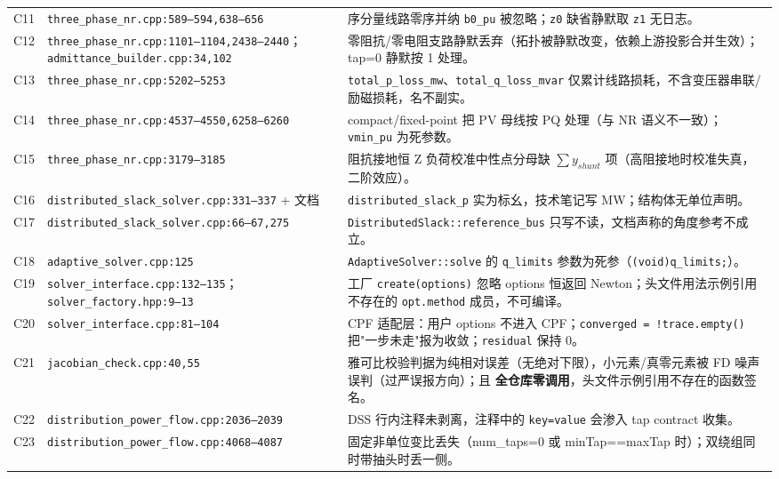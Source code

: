 \documentclass[11pt,a4paper,fontset=fandol]{ctexart}
\newcommand{\file}[1]{\texttt{#1}}
\begin{document}
\begin{footnotesize}
\begin{longtable}{@{}p{0.4cm}p{5.2cm}p{9.6cm}@{}}
C11 & \file{three\_phase\_nr.cpp:589--594,}\newline\file{638--656} & 序分量线路零序并纳 \texttt{b0\_pu} 被忽略；\texttt{z0} 缺省静默取 \texttt{z1} 无日志。\\
C12 & \file{three\_phase\_nr.cpp:1101--1104,}\newline\file{2438--2440}；\file{admittance\_builder.cpp:34,102} & 零阻抗/零电阻支路静默丢弃（拓扑被静默改变，依赖上游投影合并生效）；tap=0 静默按 1 处理。\\
C13 & \file{three\_phase\_nr.cpp:5202--5253} & \texttt{total\_p\_loss\_mw}、\texttt{total\_q\_loss\_mvar} 仅累计线路损耗，不含变压器串联/励磁损耗，名不副实。\\
C14 & \file{three\_phase\_nr.cpp:4537--4550,}\newline\file{6258--6260} & compact/fixed-point 把 PV 母线按 PQ 处理（与 NR 语义不一致）；\texttt{vmin\_pu} 为死参数。\\
C15 & \file{three\_phase\_nr.cpp:3179--3185} & 阻抗接地恒 Z 负荷校准中性点分母缺 $\sum y_{shunt}$ 项（高阻接地时校准失真，二阶效应）。\\
C16 & \file{distributed\_slack\_solver.cpp:}\newline\file{331--337} + 文档 & \texttt{distributed\_slack\_p} 实为标幺，技术笔记写 MW；结构体无单位声明。\\
C17 & \file{distributed\_slack\_solver.cpp:}\newline\file{66--67,275} & \texttt{DistributedSlack::reference\_bus} 只写不读，文档声称的角度参考不成立。\\
C18 & \file{adaptive\_solver.cpp:125} & \texttt{AdaptiveSolver::solve} 的 \texttt{q\_limits} 参数为死参（\texttt{(void)q\_limits;}）。\\
C19 & \file{solver\_interface.cpp:132--135}；\file{solver\_factory.hpp:9--13} & 工厂 \texttt{create(options)} 忽略 options 恒返回 Newton；头文件用法示例引用不存在的 \texttt{opt.method} 成员，不可编译。\\
C20 & \file{solver\_interface.cpp:81--104} & CPF 适配层：用户 options 不进入 CPF；\texttt{converged = !trace.empty()} 把"一步未走"报为收敛；\texttt{residual} 保持 0。\\
C21 & \file{jacobian\_check.cpp:40,55} & 雅可比校验判据为纯相对误差（无绝对下限），小元素/真零元素被 FD 噪声误判（过严误报方向）；且 \textbf{全仓库零调用}，头文件示例引用不存在的函数签名。\\
C22 & \file{distribution\_power\_flow.cpp:}\newline\file{2036--2039} & DSS 行内注释未剥离，注释中的 \texttt{key=value} 会渗入 tap contract 收集。\\
C23 & \file{distribution\_power\_flow.cpp:}\newline\file{4068--4087} & 固定非单位变比丢失（num\_taps=0 或 minTap==maxTap 时）；双绕组同时带抽头时丢一侧。\\
\bottomrule
\end{longtable}
\end{footnotesize}
\end{document}
